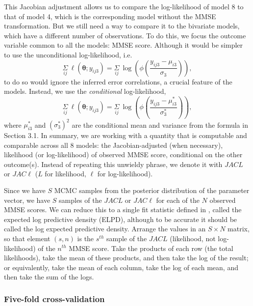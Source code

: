 \documentclass[12pt]{article}
\begin{document}
This Jacobian adjustment allows us to compare the log-likelihood of model 8 to that of model 4, which is the corresponding model without the MMSE transformation. But we still need a way to compare it to the bivariate models, which have a different number of observations. To do this, we focus the outcome variable common to all the models: MMSE score. Although it would be simpler to use the unconditional log-likelihood, i.e. 
$$ \underset{ij}{\Sigma} ~ \ell(\boldsymbol{\theta}; y_{ij3}) = \underset{ij}{\Sigma} ~ \log \left(\phi \left( \frac{y_{ij3} - \mu_{i3}}{\sigma_3} \right) \right),$$ 
to do so would ignore the inferred error correlations, a crucial feature of the models. Instead, we use the \emph{conditional} log-likelihood, 
$$ \underset{ij}{\Sigma} ~ \ell(\boldsymbol{\theta}; y_{ij3}) = \underset{ij}{\Sigma} ~ \log \left(\phi \left( \frac{y_{ij3} - \mu_{i3}^{*}}{\sigma_{3}^{*}} \right) \right),$$ 
where $\mu_{i3}^{*}$ and $(\sigma_{3}^{*})^2$ are the conditional mean and variance from the formula in Section 3.1. In summary, we are working with a quantity that is computable and comparable across all 8 models: the Jacobian-adjusted (when necessary), likelihood (or log-likelihood) of observed MMSE score, conditional on the other outcome(s). Instead of repeating this unwieldy phrase, we denote it with $JACL$ or $JAC\ell$ ($L$ for likelihood, $\ell$ for log-likelihood). 

Since we have $S$ MCMC samples from the posterior distribution of the parameter vector, we have $S$ samples of the $JACL$ or $JAC\ell$ for each of the $N$ observed MMSE scores. We can reduce this to a single fit statistic defined in  \citet{vehtari2017practical}, called the expected log predictive density (ELPD), although to be accurate it should be called the log expected predictive density. Arrange the values in an $S \times N$ matrix, so that element $(s,n)$ is the $s^{th}$ sample of the $JACL$ (likelihood, not log-likelihood) of the $n^{th}$ MMSE score. Take the products of each row (the total likelihoods), take the mean of these products, and then take the log of the result; or equivalently, take the mean of each column, take the log of each mean, and then take the sum of the logs. 

\subsubsection{Five-fold cross-validation}
\end{document}
